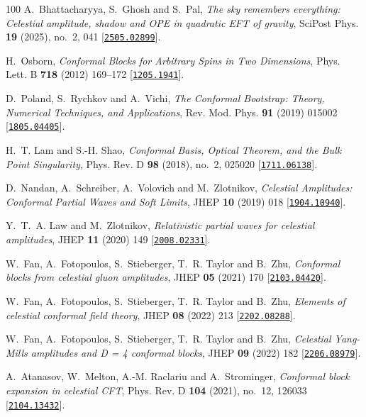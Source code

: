\begin{thebibliography}{100}
A.~Bhattacharyya, S.~Ghosh and S.~Pal,  {\em {The sky remembers everything:
  Celestial amplitude, shadow and OPE in quadratic EFT of gravity}}, SciPost
  Phys. {\bf 19} (2025), no.~2, 041
  [\href{http://www.arXiv.org/abs/2505.02899}{{\tt 2505.02899}}].

H.~Osborn,  {\em {Conformal Blocks for Arbitrary Spins in Two Dimensions}},
  Phys. Lett. B {\bf 718} (2012) 169--172
  [\href{http://www.arXiv.org/abs/1205.1941}{{\tt 1205.1941}}].

D.~Poland, S.~Rychkov and A.~Vichi,  {\em {The Conformal Bootstrap: Theory,
  Numerical Techniques, and Applications}}, Rev. Mod. Phys. {\bf 91} (2019)
  015002 [\href{http://www.arXiv.org/abs/1805.04405}{{\tt 1805.04405}}].

H.~T. Lam and S.-H. Shao,  {\em {Conformal Basis, Optical Theorem, and the Bulk
  Point Singularity}}, Phys. Rev. D {\bf 98} (2018), no.~2, 025020
  [\href{http://www.arXiv.org/abs/1711.06138}{{\tt 1711.06138}}].

D.~Nandan, A.~Schreiber, A.~Volovich and M.~Zlotnikov,  {\em {Celestial
  Amplitudes: Conformal Partial Waves and Soft Limits}}, JHEP {\bf 10} (2019)
  018 [\href{http://www.arXiv.org/abs/1904.10940}{{\tt 1904.10940}}].

Y.~T.~A. Law and M.~Zlotnikov,  {\em {Relativistic partial waves for celestial
  amplitudes}}, JHEP {\bf 11} (2020) 149
  [\href{http://www.arXiv.org/abs/2008.02331}{{\tt 2008.02331}}].

W.~Fan, A.~Fotopoulos, S.~Stieberger, T.~R. Taylor and B.~Zhu,  {\em {Conformal
  blocks from celestial gluon amplitudes}}, JHEP {\bf 05} (2021) 170
  [\href{http://www.arXiv.org/abs/2103.04420}{{\tt 2103.04420}}].

W.~Fan, A.~Fotopoulos, S.~Stieberger, T.~R. Taylor and B.~Zhu,  {\em {Elements
  of celestial conformal field theory}}, JHEP {\bf 08} (2022) 213
  [\href{http://www.arXiv.org/abs/2202.08288}{{\tt 2202.08288}}].

W.~Fan, A.~Fotopoulos, S.~Stieberger, T.~R. Taylor and B.~Zhu,  {\em {Celestial
  Yang-Mills amplitudes and D = 4 conformal blocks}}, JHEP {\bf 09} (2022) 182
  [\href{http://www.arXiv.org/abs/2206.08979}{{\tt 2206.08979}}].

A.~Atanasov, W.~Melton, A.-M. Raclariu and A.~Strominger,  {\em {Conformal
  block expansion in celestial CFT}}, Phys. Rev. D {\bf 104} (2021), no.~12,
  126033 [\href{http://www.arXiv.org/abs/2104.13432}{{\tt 2104.13432}}].


\end{thebibliography}
